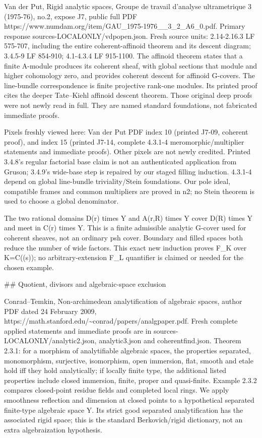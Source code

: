 \documentclass[11pt]{article}
\begin{document}
Van der Put, Rigid analytic spaces, Groupe de travail d'analyse ultrametrique 3 (1975-76), no.2, expose J7, public full PDF https://www.numdam.org/item/GAU\_1975-1976\_\_3\_2\_A6\_0.pdf. Primary response sources-LOCALONLY/vdpopen.json. Fresh source units: 2.14-2.16.3 LF 575-707, including the entire coherent-affinoid theorem and its descent diagram; 3.4.5-9 LF 854-910; 4.1-4.3.4 LF 915-1100. The affinoid theorem states that a finite A-module produces its coherent sheaf, with global sections that module and higher cohomology zero, and provides coherent descent for affinoid G-covers. The line-bundle correspondence is finite projective rank-one modules. Its printed proof cites the deeper Tate--Kiehl affinoid descent theorem. Those original deep proofs were not newly read in full. They are named standard foundations, not fabricated immediate proofs.

Pixels freshly viewed here: Van der Put PDF index 10 (printed J7-09, coherent proof), and index 15 (printed J7-14, complete 4.3.1-4 meromorphic/multiplier statements and immediate proofs). Other pixels are not newly credited. Printed 3.4.8's regular factorial base claim is not an authenticated application from Gruson; 3.4.9's wide-base step is repaired by our staged filling induction. 4.3.1-4 depend on global line-bundle triviality/Stein foundations. Our pole ideal, compatible frames and common multipliers are proved in n2; no Stein theorem is used to choose a global denominator.

The two rational domains D(r) times Y and A(r,R) times Y cover D(R) times Y and meet in C(r) times Y. This is a finite admissible analytic G-cover used for coherent sheaves, not an ordinary psh cover. Boundary and filled spaces both reduce the number of wide factors. This exact new induction proves F\_K over K=C((s)); no arbitrary-extension F\_L quantifier is claimed or needed for the chosen example.

\#\# Quotient, divisors and algebraic-space exclusion

Conrad--Temkin, Non-archimedean analytification of algebraic spaces, author PDF dated 24 February 2009, https://math.stanford.edu/\textasciitilde{}conrad/papers/analgpaper.pdf. Fresh complete applied statements and immediate proofs are in sources-LOCALONLY/analytic2.json, analytic3.json and coherentfind.json. Theorem 2.3.1: for a morphism of analytifiable algebraic spaces, the properties separated, monomorphism, surjective, isomorphism, open immersion, flat, smooth and etale hold iff they hold analytically; if locally finite type, the additional listed properties include closed immersion, finite, proper and quasi-finite. Example 2.3.2 compares closed-point residue fields and completed local rings. We apply smoothness reflection and dimension at closed points to a hypothetical separated finite-type algebraic space Y. Its strict good separated analytification has the associated rigid space; this is the standard Berkovich/rigid dictionary, not an extra algebraization hypothesis.
\end{document}

